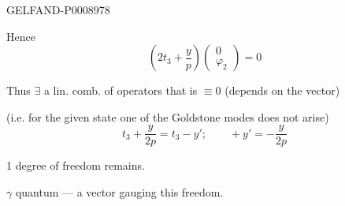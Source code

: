 \begin{GelfandAdjacentEvidence}{GELFAND-P000897}{8}


Hence
\[
\left(2t_3+\frac{y}{p}\right)\begin{pmatrix}0\\\varphi_2\end{pmatrix}=0
\]

Thus $\exists$ a lin. comb. of operators that is $\equiv0$ (depends on the vector)

(i.e. for the given state one of the Goldstone modes does not arise)
\[
t_3+\frac{y}{2p}=t_3-y'\mathpunct{;}\qquad +y'=-\frac{y}{2p}
\]

1 degree of freedom remains.

$\gamma$ quantum — a vector gauging this freedom.
\end{GelfandAdjacentEvidence}



